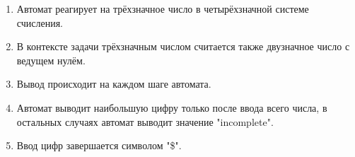 

\begin{enumerate}

    \item Автомат реагирует на трёхзначное число в четырёхзначной системе
        счисления.

    \item В контексте задачи трёхзначным числом считается также
        двузначное число с ведущем нулём.

    \item Вывод происходит на каждом шаге автомата.

    \item Автомат выводит наибольшую цифру только после ввода всего
        числа, в остальных случаях автомат выводит значение "incomplete".

    \item Ввод цифр завершается символом "\$".

\end{enumerate}

